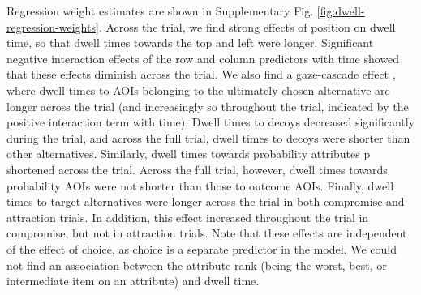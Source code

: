 \documentclass[11pt, a4paper]{article}
\begin{document}
\begin{refsection}
Regression weight estimates are shown in Supplementary Fig. \ref{fig:dwell-regression-weights}. Across the trial, we find strong effects of position on dwell time, so that dwell times towards the top and left were longer. Significant negative interaction effects of the row and column predictors with time showed that these effects diminish across the trial. We also find a gaze-cascade effect \parencite{mullett2016ImplicationsVisualAttention,shimojo2003GazeBiasBoth}, where dwell times to AOIs belonging to the ultimately chosen alternative are longer across the trial (and increasingly so throughout the trial, indicated by the positive interaction term with time). Dwell times to decoys decreased significantly during the trial, and across the full trial, dwell times to decoys were shorter than other alternatives. Similarly, dwell times towards probability attributes p shortened across the trial. Across the full trial, however, dwell times towards probability AOIs were not shorter than those to outcome AOIs. Finally, dwell times to target alternatives were longer across the trial in both compromise and attraction trials. In addition, this effect increased throughout the trial in compromise, but not in attraction trials. Note that these effects are independent of the effect of choice, as choice is a separate predictor in the model. We could not find an association between the attribute rank (being the worst, best, or intermediate item on an attribute) and dwell time.


\end{refsection}
\end{document}
